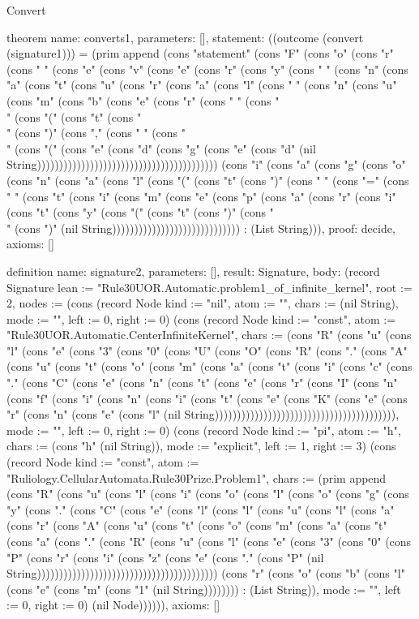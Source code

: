 \begin{lexlean}{Convert}
\begin{semanticmodule}
theorem{
  name: converts1,
  parameters: [],
  statement: ((outcome (convert (signature1))) = (prim append (cons "statement" (cons "F" (cons "o" (cons "r" (cons " " (cons "e" (cons "v" (cons "e" (cons "r" (cons "y" (cons " " (cons "n" (cons "a" (cons "t" (cons "u" (cons "r" (cons "a" (cons "l" (cons " " (cons "n" (cons "u" (cons "m" (cons "b" (cons "e" (cons "r" (cons " " (cons "\\" (cons "(" (cons "t" (cons "\\" (cons ")" (cons "," (cons " " (cons "\\" (cons "(" (cons "e" (cons "d" (cons "g" (cons "e" (cons "d" (nil String))))))))))))))))))))))))))))))))))))))))) (cons "i" (cons "a" (cons "g" (cons "o" (cons "n" (cons "a" (cons "l" (cons "(" (cons "t" (cons ")" (cons " " (cons "=" (cons " " (cons "t" (cons "i" (cons "m" (cons "e" (cons "p" (cons "a" (cons "r" (cons "i" (cons "t" (cons "y" (cons "(" (cons "t" (cons ")" (cons "\\" (cons ")" (nil String))))))))))))))))))))))))))))) : (List String))),
  proof: decide{},
  axioms: []
}

definition{
  name: signature2,
  parameters: [],
  result: Signature,
  body: (record Signature {lean := "Rule30UOR.Automatic.problem1_of_infinite_kernel", root := 2, nodes := (cons (record Node {kind := "nil", atom := "", chars := (nil String), mode := "", left := 0, right := 0}) (cons (record Node {kind := "const", atom := "Rule30UOR.Automatic.CenterInfiniteKernel", chars := (cons "R" (cons "u" (cons "l" (cons "e" (cons "3" (cons "0" (cons "U" (cons "O" (cons "R" (cons "." (cons "A" (cons "u" (cons "t" (cons "o" (cons "m" (cons "a" (cons "t" (cons "i" (cons "c" (cons "." (cons "C" (cons "e" (cons "n" (cons "t" (cons "e" (cons "r" (cons "I" (cons "n" (cons "f" (cons "i" (cons "n" (cons "i" (cons "t" (cons "e" (cons "K" (cons "e" (cons "r" (cons "n" (cons "e" (cons "l" (nil String))))))))))))))))))))))))))))))))))))))))), mode := "", left := 0, right := 0}) (cons (record Node {kind := "pi", atom := "h", chars := (cons "h" (nil String)), mode := "explicit", left := 1, right := 3}) (cons (record Node {kind := "const", atom := "Ruliology.CellularAutomata.Rule30Prize.Problem1", chars := (prim append (cons "R" (cons "u" (cons "l" (cons "i" (cons "o" (cons "l" (cons "o" (cons "g" (cons "y" (cons "." (cons "C" (cons "e" (cons "l" (cons "l" (cons "u" (cons "l" (cons "a" (cons "r" (cons "A" (cons "u" (cons "t" (cons "o" (cons "m" (cons "a" (cons "t" (cons "a" (cons "." (cons "R" (cons "u" (cons "l" (cons "e" (cons "3" (cons "0" (cons "P" (cons "r" (cons "i" (cons "z" (cons "e" (cons "." (cons "P" (nil String))))))))))))))))))))))))))))))))))))))))) (cons "r" (cons "o" (cons "b" (cons "l" (cons "e" (cons "m" (cons "1" (nil String)))))))) : (List String)), mode := "", left := 0, right := 0}) (nil Node)))))}),
  axioms: []
}


\end{semanticmodule}
\end{lexlean}
